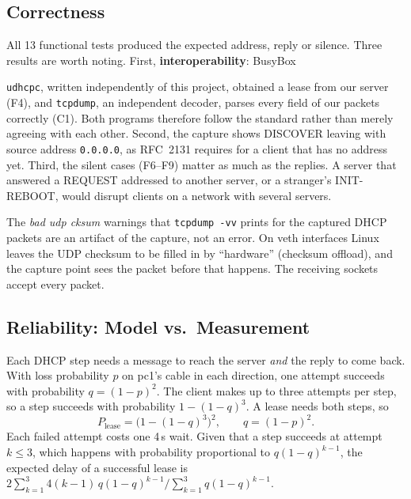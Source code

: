 \documentclass[11pt]{article}
\begin{document}
\subsection{Correctness}
All 13 functional tests produced the expected address, reply or
silence. Three results are worth noting. First, \textbf{interoperability}: BusyBox

\texttt{udhcpc}, written independently of this project, obtained a lease from our server
(F4), and \texttt{tcpdump}, an independent decoder, parses every field of our packets
correctly (C1). Both programs therefore follow the standard rather than merely agreeing
with each other. Second, the capture shows DISCOVER leaving with source address
\texttt{0.0.0.0}, as RFC~2131 requires for a client that has no address yet. Third, the
silent cases (F6--F9) matter as much as the replies. A server that answered a REQUEST
addressed to another server, or a stranger's INIT-REBOOT, would disrupt clients on a
network with several servers.

The \emph{bad udp cksum} warnings that \texttt{tcpdump -vv} prints for the captured DHCP
packets are an artifact of the capture, not an error. On veth interfaces Linux leaves the
UDP checksum to be filled in by ``hardware'' (checksum offload), and the capture point
sees the packet before that happens. The receiving sockets accept every packet.

\subsection{Reliability: Model vs.\ Measurement}
\label{sec:lossanalysis}
Each DHCP step needs a message to reach the server \emph{and} the reply to come back.
With loss probability $p$ on pc1's cable in each direction, one attempt succeeds with
probability $q=(1-p)^2$. The client makes up to three attempts per step, so a step
succeeds with probability $1-(1-q)^3$. A lease needs both steps, so
\[
P_{\text{lease}} = \bigl(1-(1-q)^3\bigr)^2, \qquad q=(1-p)^2 .
\]
Each failed attempt costs one 4\,s wait. Given that a step succeeds at attempt $k\le3$,
which happens with probability proportional to $q(1-q)^{k-1}$, the expected delay of a
successful lease is
$2\sum_{k=1}^{3}4(k-1)\,q(1-q)^{k-1}\big/\sum_{k=1}^{3}q(1-q)^{k-1}$.
\end{document}
